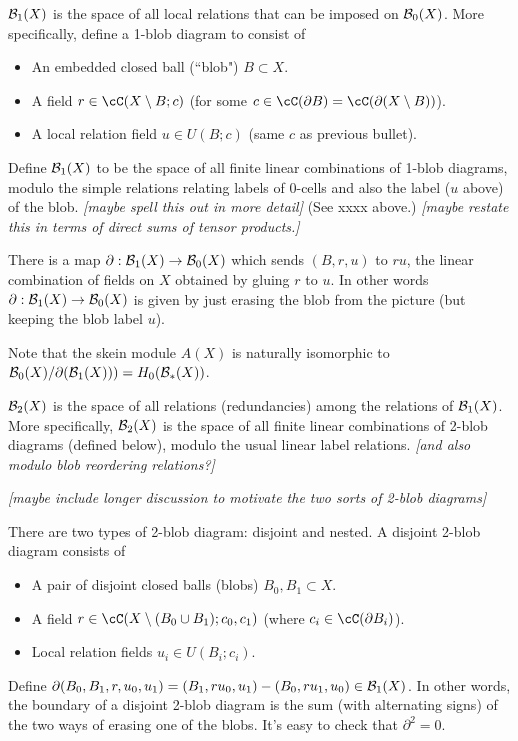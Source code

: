 \documentclass[11pt,leqno]{article}
\def\bc{{\cal B}}
\def\bd{\partial}
\def\sub{\subset}
\def\setmin{\setminus}
\def\nn#1{{{\it \small [#1]}}}
\begin{document}
$\bc_1(X)$ is the space of all local relations that can be imposed on $\bc_0(X)$.
More specifically, define a 1-blob diagram to consist of
\begin{itemize}
\item An embedded closed ball (``blob") $B \sub X$.
\item A field $r \in \cC(X \setmin B; c)$
(for some $c \in \cC(\bd B) = \cC(\bd(X \setmin B))$).
\item A local relation field $u \in U(B; c)$
(same $c$ as previous bullet).
\end{itemize}
Define $\bc_1(X)$ to be the space of all finite linear combinations of
1-blob diagrams, modulo the simple relations relating labels of 0-cells and
also the label ($u$ above) of the blob.
\nn{maybe spell this out in more detail}
(See xxxx above.)
\nn{maybe restate this in terms of direct sums of tensor products.}

There is a map $\bd : \bc_1(X) \to \bc_0(X)$ which sends $(B, r, u)$ to $ru$, the linear
combination of fields on $X$ obtained by gluing $r$ to $u$.
In other words $\bd : \bc_1(X) \to \bc_0(X)$ is given by 
just erasing the blob from the picture
(but keeping the blob label $u$).

Note that the skein module $A(X)$
is naturally isomorphic to $\bc_0(X)/\bd(\bc_1(X))) = H_0(\bc_*(X))$.

$\bc_2(X)$ is the space of all relations (redundancies) among the relations of $\bc_1(X)$.
More specifically, $\bc_2(X)$ is the space of all finite linear combinations of 
2-blob diagrams (defined below), modulo the usual linear label relations.
\nn{and also modulo blob reordering relations?}

\nn{maybe include longer discussion to motivate the two sorts of 2-blob diagrams}

There are two types of 2-blob diagram: disjoint and nested.
A disjoint 2-blob diagram consists of
\begin{itemize}
\item A pair of disjoint closed balls (blobs) $B_0, B_1 \sub X$.
\item A field $r \in \cC(X \setmin (B_0 \cup B_1); c_0, c_1)$
(where $c_i \in \cC(\bd B_i)$).
\item Local relation fields $u_i \in U(B_i; c_i)$.
\end{itemize}
Define $\bd(B_0, B_1, r, u_0, u_1) = (B_1, ru_0, u_1) - (B_0, ru_1, u_0) \in \bc_1(X)$.
In other words, the boundary of a disjoint 2-blob diagram
is the sum (with alternating signs)
of the two ways of erasing one of the blobs.
It's easy to check that $\bd^2 = 0$.
\end{document}
